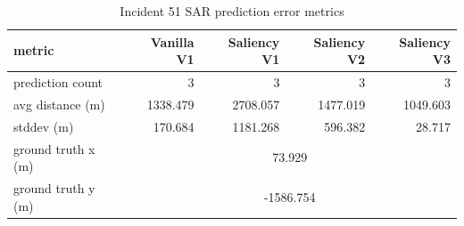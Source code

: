 \begin{table}[ht]
\centering
\caption{Incident 51 SAR prediction error metrics}
\label{tab:sar-incident-51}
\begin{tabular}{lrrrr}
\hline
metric & Vanilla V1 & Saliency V1 & Saliency V2 & Saliency V3 \\
\hline
prediction count & 3 & 3 & 3 & 3 \\
avg distance (m) & 1338.479 & 2708.057 & 1477.019 & 1049.603 \\
stddev (m) & 170.684 & 1181.268 & 596.382 & 28.717 \\
ground truth x (m) & \multicolumn{4}{c}{73.929} \\
ground truth y (m) & \multicolumn{4}{c}{-1586.754} \\
\hline
\end{tabular}
\end{table}
